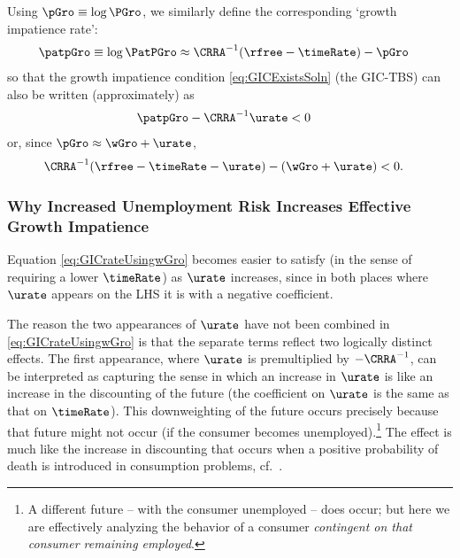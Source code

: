 \documentclass{\handout}
\begin{document}
Using $\pGro \equiv \log \PGro$, we similarly define the corresponding `growth impatience rate':
\begin{equation}\begin{gathered}\begin{aligned}
  \patpGro & \equiv  \log \PatPGro \approx \CRRA^{-1}(\rfree-\timeRate) - \pGro
\end{aligned}\end{gathered}\end{equation}
so that the growth impatience condition \eqref{eq:GICExistsSoln} (the GIC-TBS) can also be written (approximately) as
\begin{equation}\begin{gathered}\begin{aligned}
  \patpGro - \CRRA^{-1}\urate & <  0   \label{eq:GICrateUsingpGro}
\end{aligned}\end{gathered}\end{equation}
or, since $\pGro \approx \wGro+\urate$, 
\begin{equation}\begin{gathered}\begin{aligned}
 \CRRA^{-1}(\rfree-\timeRate-\urate)-(\wGro+\urate) & <  0 \label{eq:GICrateUsingwGro}
.
\end{aligned}\end{gathered}\end{equation}

\subsubsection{Why Increased Unemployment Risk Increases Effective Growth Impatience}

Equation \eqref{eq:GICrateUsingwGro} becomes easier to satisfy (in the sense of requiring  a lower $\timeRate$) as $\urate$ increases, since in both places where $\urate$ appears on the LHS it is with a negative coefficient.

The reason the two appearances of $\urate$ have not been combined in \eqref{eq:GICrateUsingwGro} is that the separate 
terms reflect two logically distinct effects.  The first appearance, where $\urate$ is premultiplied by $-\CRRA^{-1}$, 
can be interpreted as capturing the sense in which an increase in $\urate$ is like an increase in the discounting of the future (the
coefficient on $\urate$ is the same as that on $\timeRate$).  This downweighting of the future occurs precisely because that future
might not occur (if the consumer becomes unemployed).\footnote{A different future -- with the consumer unemployed -- does occur; but here we are effectively analyzing the behavior of a consumer {\it contingent on that consumer remaining employed}.}  The effect is much like the increase in discounting that occurs 
when a positive probability of death is introduced in consumption problems, cf.~\cite{blanchardFinite}.
\end{document}
